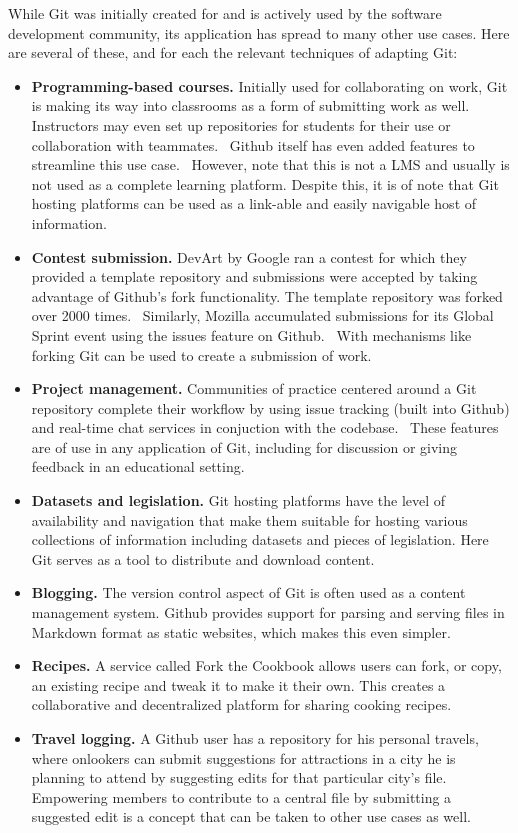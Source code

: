 \documentclass[12pt,twoside]{mitthesis}
\begin{document}
While Git was initially created for and is actively used by the software development community, its application has spread to many other use cases. Here are several of these, and for each the relevant techniques of adapting Git:
\begin{itemize}
\item \textbf{Programming-based courses.} Initially used for collaborating on work, Git is making its way into classrooms as a form of submitting work as well. Instructors may even set up repositories for students for their use or collaboration with teammates.~\cite{whygithubclassroom} Github itself has even added features to streamline this use case.~\cite{githubclassroom} However, note that this is not a LMS and usually is not used as a complete learning platform. Despite this, it is of note that Git hosting platforms can be used as a link-able and easily navigable host of information.
\item \textbf{Contest submission.} DevArt by Google ran a contest for which they provided a template repository and submissions were accepted by taking advantage of Github's fork functionality. The template repository was forked over 2000 times.~\cite{devart} Similarly, Mozilla accumulated submissions for its Global Sprint event using the issues feature on Github.~\cite{globalsprint} With mechanisms like forking Git can be used to create a submission of work.
\item \textbf{Project management.} Communities of practice centered around a Git repository complete their workflow by using issue tracking (built into Github) and real-time chat services in conjuction with the codebase.~\cite{githubpm} These features are of use in any application of Git, including for discussion or giving feedback in an educational setting.
\item \textbf{Datasets and legislation.} Git hosting platforms have the level of availability and navigation that make them suitable for hosting various collections of information including datasets and pieces of legislation. Here Git serves as a tool to distribute and download content.~\cite{sevenwaysgit}
\item \textbf{Blogging.} The version control aspect of Git is often used as a content management system. Github provides support for parsing and serving files in Markdown format as static websites, which makes this even simpler.~\cite{whygithubclassroom}
\item \textbf{Recipes.} A service called Fork the Cookbook allows users can fork, or copy, an existing recipe and tweak it to make it their own. This creates a collaborative and decentralized platform for sharing cooking recipes.~\cite{forkthecookbook}
\item \textbf{Travel logging.} A Github user has a repository for his personal travels, where onlookers can submit suggestions for attractions in a city he is planning to attend by suggesting edits for that particular city's file.~\cite{travellog} Empowering members to contribute to a central file by submitting a suggested edit is a concept that can be taken to other use cases as well.
\end{itemize}
\end{document}
